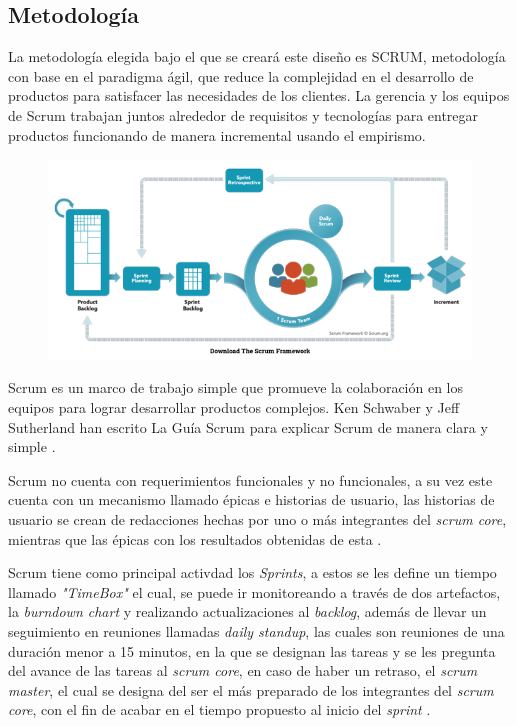 \documentclass[10pt]{article}
\begin{document}
\subsection{Metodología}
La metodología elegida bajo el que se creará este diseño es SCRUM, metodología con base en el paradigma ágil, que reduce la complejidad en el desarrollo de productos para satisfacer las necesidades de los clientes. La gerencia y los equipos de Scrum trabajan juntos alrededor de requisitos y tecnologías para entregar productos funcionando de manera incremental usando el empirismo. 

\begin{figure}[H]
	\begin{center}
\includegraphics[scale = 0.80]{Imagenes/ScrumFramework.png}
	\end{center} 
\end{figure}

Scrum es un marco de trabajo simple que promueve la colaboración en los equipos para lograr desarrollar productos complejos. Ken Schwaber y Jeff Sutherland han escrito La Guía Scrum para explicar Scrum de manera clara y simple \cite{IEEEreferencias:Ref21}. \newline

\setlength{\parskip}{2mm}

Scrum no cuenta con requerimientos funcionales y no funcionales, a su vez este cuenta con un mecanismo llamado épicas e historias de usuario, las historias de usuario se crean de redacciones hechas por uno o más integrantes del \textit{scrum core}, mientras que las épicas con los resultados obtenidas de esta \cite{IEEEreferencias:Ref21}.\newline

\setlength{\parskip}{2mm}

Scrum tiene como principal activdad los \textit{Sprints}, a estos se les define un tiempo llamado \textit{"TimeBox"} el cual, se puede ir monitoreando a través de dos artefactos, la \textit{burndown chart} y realizando actualizaciones al \textit{backlog}, además de llevar un seguimiento en reuniones llamadas \textit{daily standup}, las cuales son reuniones de una duración menor a 15 minutos, en la que se designan las tareas y se les pregunta del avance de las tareas al \textit{scrum core}, en caso de haber un retraso, el \textit{scrum master}, el cual se designa del ser el más preparado de los integrantes del \textit{scrum core}, con el fin de acabar en el tiempo propuesto al inicio del \textit{sprint} \cite{IEEEreferencias:Ref21}.\newline
\end{document}
